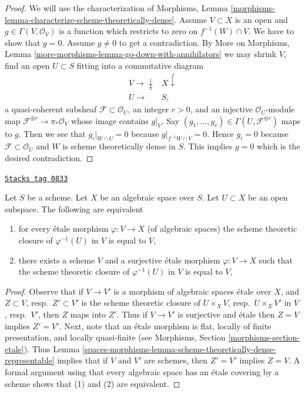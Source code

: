 \begin{proof}
We will use the characterization of Morphisms, Lemma
\ref{morphisms-lemma-characterize-scheme-theoretically-dense}.
Assume $V \subset X$ is an open and $g \in \Gamma(V, \mathcal{O}_V)$
is a function which restricts to zero on $f^{-1}(W) \cap V$.
We have to show that $g = 0$. Assume $g \not = 0$ to get a
contradiction. By
More on Morphisms, Lemma \ref{more-morphisms-lemma-go-down-with-annihilators}
we may shrink $V$, find an open $U \subset S$ fitting into a
commutative diagram
$$
\begin{array}{cc}V \longrightarrow\underset{\pi}{\downarrow} & X \overset{f}{\downarrow} \\ U \longrightarrow & S,\end{array}
$$
a quasi-coherent subsheaf $\mathcal{F} \subset \mathcal{O}_U$, an integer
$r > 0$, and an injective $\mathcal{O}_U$-module map
$\mathcal{F}^{\oplus r} \to \pi_*\mathcal{O}_V$
whose image contains $g|_V$. Say
$(g_1, \ldots, g_r) \in \Gamma(U, \mathcal{F}^{\oplus r})$ maps to $g$.
Then we see that $g_i|_{W \cap U} = 0$ because $g|_{f^{-1}W \cap V} = 0$.
Hence $g_i = 0$ because $\mathcal{F} \subset \mathcal{O}_U$ and
$W$ is scheme theoretically dense in $S$.
This implies $g = 0$ which is the desired contradiction.
\end{proof}

\begin{lemma}
\label{spaces-morphisms-lemma-scheme-theoretically-dense}
\href{https://stacks.math.columbia.edu/tag/0833}{\texttt{Stacks tag 0833}}

Let $S$ be a scheme.
Let $X$ be an algebraic space over $S$.
Let $U \subset X$ be an open subspace.
The following are equivalent
\begin{enumerate}
\item for every \'etale morphism $\varphi : V \to X$ (of algebraic spaces)
the scheme theoretic closure of $\varphi^{-1}(U)$ in $V$ is equal to $V$,
\item there exists a scheme $V$ and a surjective \'etale morphism
$\varphi : V \to X$ such that the scheme theoretic closure of
$\varphi^{-1}(U)$ in $V$ is equal to $V$,
\end{enumerate}
\end{lemma}

\begin{proof}
Observe that if $V \to V'$ is a morphism of algebraic spaces \'etale
over $X$, and $Z \subset V$, resp.\ $Z' \subset V'$ is the scheme theoretic
closure of $U \times_X V$, resp.\ $U \times_X V'$ in $V$, resp.\ $V'$,
then $Z$ maps into $Z'$. Thus if $V \to V'$ is surjective and \'etale
then $Z = V$ implies $Z' = V'$. Next, note that an \'etale morphism is
flat, locally of finite presentation, and locally quasi-finite
(see Morphisms, Section \ref{morphisms-section-etale}).
Thus Lemma \ref{spaces-morphisms-lemma-scheme-theoretically-dense-representable}
implies that if $V$ and $V'$ are schemes, then $Z' = V'$ implies
$Z = V$. A formal argument using that every algebraic space has an
\'etale covering by a scheme shows that (1) and (2) are equivalent.
\end{proof}

